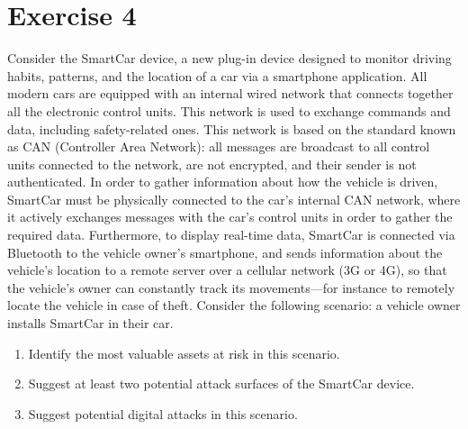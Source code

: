 \section{Exercise 4}

Consider the SmartCar device, a new plug-in device designed to monitor driving habits, patterns, and the location of a car via a smartphone application.
All modern cars are equipped with an internal wired network that connects together all the electronic control units. 
This network is used to exchange commands and data, including safety-related ones. 
This network is based on the standard known as CAN (Controller Area Network): all messages are broadcast to all control units connected to the network, are not encrypted, and their sender is not authenticated. 
In order to gather information about how the vehicle is driven, SmartCar must be physically connected to the car's internal CAN network, where it actively exchanges messages with the car's control units in order to gather the required data.
Furthermore, to display real-time data, SmartCar is connected via Bluetooth to the vehicle owner's smartphone, and sends information about the vehicle's location to a remote server over a cellular network (3G or 4G), so that the vehicle's owner can constantly track its movements—for instance to remotely locate the vehicle in case of theft.
Consider the following scenario: a vehicle owner installs SmartCar in their car.
\begin{enumerate}
    \item Identify the most valuable assets at risk in this scenario.
    \item Suggest at least two potential attack surfaces of the SmartCar device.
    \item Suggest potential digital attacks in this scenario.
\end{enumerate}

